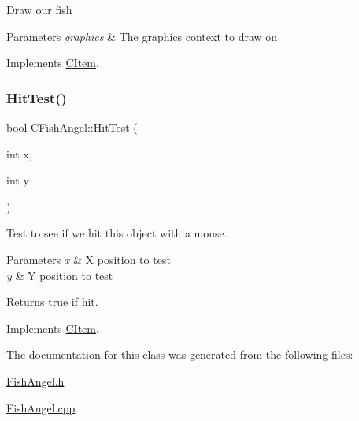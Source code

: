 Draw our fish 
\begin{DoxyParams}{Parameters}
{\em graphics} & The graphics context to draw on \\
\hline
\end{DoxyParams}


Implements \mbox{\hyperlink{class_c_item_a7ef8448d0c4bc53d0f1943a4dc817f6f}{C\+Item}}.

\mbox{\label{class_c_fish_angel_a7bc5bf0fbb87b728e4ed0ef8da8a5841}} 
\subsubsection{\texorpdfstring{HitTest()}{HitTest()}}
{\footnotesize\ttfamily bool C\+Fish\+Angel\+::\+Hit\+Test (\begin{DoxyParamCaption}\item[{int}]{x,  }\item[{int}]{y }\end{DoxyParamCaption})\hspace{0.3cm}{\ttfamily [virtual]}}

Test to see if we hit this object with a mouse. 
\begin{DoxyParams}{Parameters}
{\em x} & X position to test \\
\hline
{\em y} & Y position to test \\
\hline
\end{DoxyParams}
\begin{DoxyReturn}{Returns}
true if hit. 
\end{DoxyReturn}


Implements \mbox{\hyperlink{class_c_item_a8bd4f5e3f2eb2487125dd435719484e8}{C\+Item}}.



The documentation for this class was generated from the following files\+:\begin{DoxyCompactItemize}
\item 
\mbox{\hyperlink{_fish_angel_8h}{Fish\+Angel.\+h}}\item 
\mbox{\hyperlink{_fish_angel_8cpp}{Fish\+Angel.\+cpp}}\end{DoxyCompactItemize}
